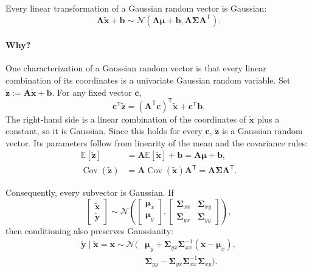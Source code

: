 \documentclass[11pt]{article}
\newcommand{\E}{\mathbb{E}}
\newcommand{\Cov}{\operatorname{Cov}}
\newcommand{\rvv}[1]{\widetilde{\bm{#1}}}
\begin{document}
Every linear transformation of a Gaussian random vector is Gaussian:
\[
  \bm{A}\rvv{x}+\bm{b}
  \sim\mathcal N\!\left(\bm{A}\bm{\mu}+\bm{b},
    \bm{A}\bm{\Sigma}\bm{A}^{\mathsf T}\right).
\]
\paragraph{Why?}
One characterization of a Gaussian random vector is that every linear
combination of its coordinates is a univariate Gaussian random variable.  Set
$\rvv{z}:=\bm{A}\rvv{x}+\bm{b}$.  For any fixed vector $\bm{c}$,
\[
  \bm{c}^{\mathsf T}\rvv{z}
  =(\bm{A}^{\mathsf T}\bm{c})^{\mathsf T}\rvv{x}
    +\bm{c}^{\mathsf T}\bm{b}.
\]
The right-hand side is a linear combination of the coordinates of
$\rvv{x}$ plus a constant, so it is Gaussian.  Since this holds for every
$\bm{c}$, $\rvv{z}$ is a Gaussian random vector.  Its parameters follow from
linearity of the mean and the covariance rules:
\begin{align*}
  \E[\rvv{z}]&=\bm{A}\E[\rvv{x}]+\bm{b}
    =\bm{A}\bm{\mu}+\bm{b},\\
  \Cov(\rvv{z})&=\bm{A}\Cov(\rvv{x})\bm{A}^{\mathsf T}
    =\bm{A}\bm{\Sigma}\bm{A}^{\mathsf T}.
\end{align*}

Consequently, every subvector is Gaussian.  If
\[
  \begin{bmatrix}\rvv{x}\\ \rvv{y}\end{bmatrix}
  \sim \mathcal N\!\left(
  \begin{bmatrix}\bm{\mu}_x\\ \bm{\mu}_y\end{bmatrix},
  \begin{bmatrix}
    \bm{\Sigma}_{xx} & \bm{\Sigma}_{xy}\\
    \bm{\Sigma}_{yx} & \bm{\Sigma}_{yy}
  \end{bmatrix}\right),
\]
then conditioning also preserves Gaussianity:
\begin{align*}
  \rvv{y}\mid\rvv{x}=\bm{x}
  \sim\mathcal N\!\big(&\bm{\mu}_y+
    \bm{\Sigma}_{yx}\bm{\Sigma}_{xx}^{-1}
      (\bm{x}-\bm{\mu}_x),\\[-0.2em]
    &\bm{\Sigma}_{yy}-
    \bm{\Sigma}_{yx}\bm{\Sigma}_{xx}^{-1}\bm{\Sigma}_{xy}\big).
\end{align*}
\end{document}
